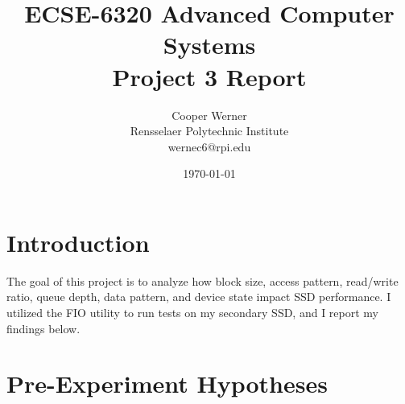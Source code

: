 \documentclass[11pt]{article}
\title{\textbf{ECSE-6320 Advanced Computer Systems \\ Project 3 Report}}
\author{Cooper Werner \\\small Rensselaer Polytechnic Institute \\ \small wernec6@rpi.edu }
\date{\today}
\begin{document}
\maketitle

\tableofcontents
\newpage

\section{Introduction}


The goal of this project is to analyze how block size, access pattern, read/write ratio, queue depth, data pattern, and
device state impact SSD performance. I utilized the FIO utility to run tests on my secondary SSD, and I report my
findings below.

\section{Pre-Experiment Hypotheses}
\end{document}
